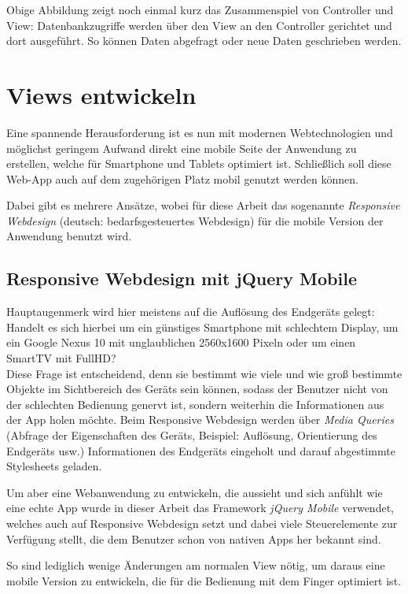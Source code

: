 Obige Abbildung zeigt noch einmal kurz das Zusammenspiel von Controller und View: Datenbankzugriffe werden über den View an den Controller gerichtet und dort ausgeführt. So können Daten abgefragt oder neue Daten geschrieben werden.

\section{Views entwickeln}
Eine spannende Herausforderung ist es nun mit modernen Webtechnologien und möglichst geringem Aufwand direkt eine mobile Seite der Anwendung zu erstellen, welche für Smartphone und Tablets optimiert ist. Schließlich soll diese Web-App auch auf dem zugehörigen Platz mobil genutzt werden können.\par

Dabei gibt es mehrere Ansätze, wobei für diese Arbeit das sogenannte \emph{Responsive Webdesign} (deutsch: bedarfsgesteuertes Webdesign) für die mobile Version der Anwendung benutzt wird.

\subsection{Responsive Webdesign mit jQuery Mobile}
Hauptaugenmerk wird hier meistens auf die Auflösung des Endgeräts gelegt: Handelt es sich hierbei um ein günstiges Smartphone mit schlechtem Display, um ein Google Nexus 10 mit unglaublichen 2560x1600 Pixeln oder um einen SmartTV mit FullHD?\\
Diese Frage ist entscheidend, denn sie bestimmt wie viele und wie groß bestimmte Objekte im Sichtbereich des Geräts sein können, sodass der Benutzer nicht von der schlechten Bedienung genervt ist, sondern weiterhin die Informationen aus der App holen möchte. Beim Responsive Webdesign werden über \emph{Media Queries} (Abfrage der Eigenschaften des Geräts, Beispiel: Auflösung, Orientierung des Endgeräts usw.) Informationen des Endgeräts eingeholt und darauf abgestimmte Stylesheets geladen.\par

Um aber eine Webanwendung zu entwickeln, die aussieht und sich \glqq anfühlt\grqq{} wie eine echte App wurde in dieser Arbeit das Framework \emph{jQuery Mobile} verwendet, welches auch auf Responsive Webdesign setzt und dabei viele Steuerelemente zur Verfügung stellt, die dem Benutzer schon von nativen Apps her bekannt sind.\par

So sind lediglich wenige Änderungen am normalen View nötig, um daraus eine mobile Version zu entwickeln, die für die Bedienung mit dem Finger optimiert ist.










